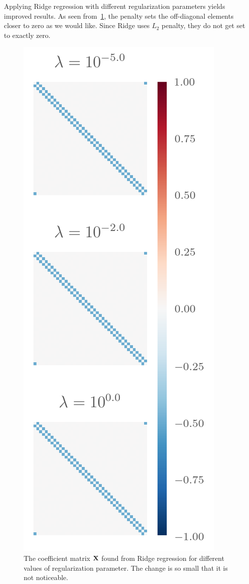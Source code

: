 Applying Ridge regression with different regularization parameters yields
improved results. As seen from~\cref{fig:ridge_coeff}, the penalty sets the
off-diagonal elements closer to zero as we would like. Since Ridge uses
\(L_{2}\) penalty, they do not get set to exactly zero.

\begin{figure}[H]
  \centering
  \includegraphics[]{figures/ridge_coeff.png}
  \caption{\label{fig:ridge_coeff} The coefficient matrix \(\vb{X}\) found from
    Ridge regression for different values of regularization parameter. The
    change is so small that it is not noticeable.}
\end{figure}

